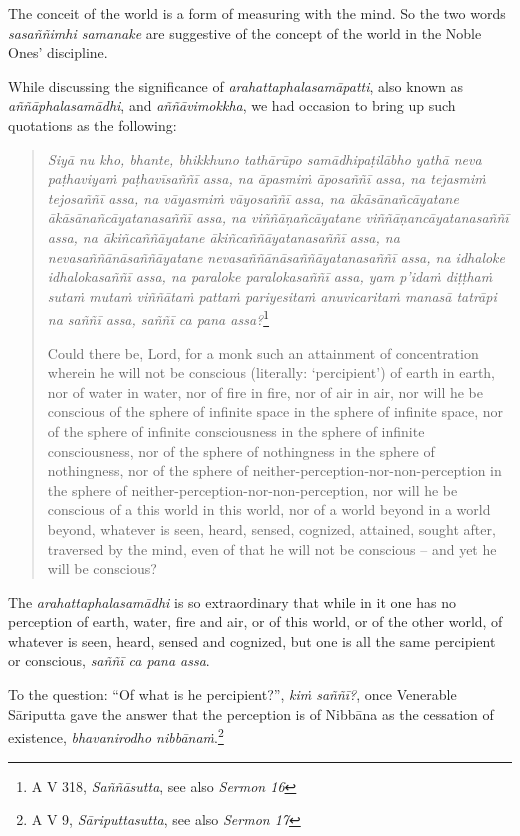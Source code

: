 The conceit of the world is a form of measuring with the mind. So the two words \emph{sasaññimhi samanake} are suggestive of the concept of the world in the Noble Ones' discipline.

While discussing the significance of \emph{arahattaphalasamāpatti}, also known as \emph{aññāphalasamādhi}, and \emph{aññāvimokkha}, we had occasion to bring up such quotations as the following:

\begin{quote}
\emph{Siyā nu kho, bhante, bhikkhuno tathārūpo samādhipaṭilābho yathā neva paṭhaviyaṁ paṭhavīsaññī assa, na āpasmiṁ āposaññī assa, na tejasmiṁ tejosaññī assa, na vāyasmiṁ vāyosaññī assa, na ākāsānañcāyatane ākāsānañcāyatanasaññī assa, na viññāṇañcāyatane viññāṇancāyatanasaññī assa, na ākiñcaññāyatane ākiñcaññāyatanasaññī assa, na nevasaññānāsaññāyatane nevasaññānāsaññāyatanasaññī assa, na idhaloke idhalokasaññī assa, na paraloke paralokasaññī assa, yam p'idaṁ diṭṭhaṁ sutaṁ mutaṁ viññātaṁ pattaṁ pariyesitaṁ anuvicaritaṁ manasā tatrāpi na saññī assa, saññī ca pana assa?}\footnote{A V 318, \emph{Saññāsutta}, see also \emph{Sermon 16}}

Could there be, Lord, for a monk such an attainment of concentration wherein he will not be conscious (literally: `percipient') of earth in earth, nor of water in water, nor of fire in fire, nor of air in air, nor will he be conscious of the sphere of infinite space in the sphere of infinite space, nor of the sphere of infinite consciousness in the sphere of infinite consciousness, nor of the sphere of nothingness in the sphere of nothingness, nor of the sphere of neither-perception-nor-non-perception in the sphere of neither-perception-nor-non-perception, nor will he be conscious of a this world in this world, nor of a world beyond in a world beyond, whatever is seen, heard, sensed, cognized, attained, sought after, traversed by the mind, even of that he will not be conscious -- and yet he will be conscious?
\end{quote}

The \emph{arahattaphalasamādhi} is so extraordinary that while in it one has no perception of earth, water, fire and air, or of this world, or of the other world, of whatever is seen, heard, sensed and cognized, but one is all the same percipient or conscious, \emph{saññī ca pana assa}.

To the question: ``Of what is he percipient?'', \emph{kiṁ saññī?}, once Venerable Sāriputta gave the answer that the perception is of Nibbāna as the cessation of existence, \emph{bhavanirodho nibbānaṁ}.\footnote{A V 9, \emph{Sāriputtasutta}, see also \emph{Sermon 17}}

